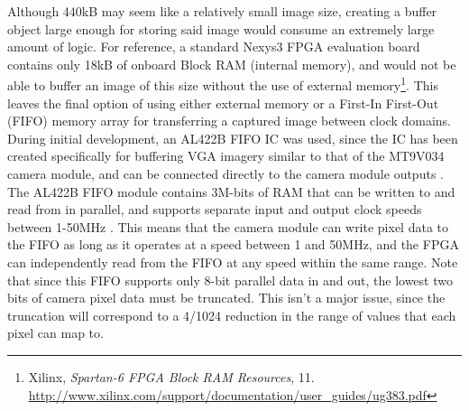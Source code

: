 Although 440kB may seem like a relatively small image size, creating a buffer object large enough for storing said image would consume an extremely large amount of logic. For reference, a standard Nexys3 FPGA evaluation board contains only 18kB of onboard Block RAM (internal memory), and would not be able to buffer an image of this size without the use of external memory\footnote{Xilinx, \textit{Spartan-6 FPGA Block RAM Resources}, 11.\\  \url{http://www.xilinx.com/support/documentation/user_guides/ug383.pdf}}. This leaves the final option of using either external memory or a First-In First-Out (FIFO) memory array for transferring a captured image between clock domains. During initial development, an AL422B FIFO IC was used, since the IC has been created specifically for buffering VGA imagery similar to that of the MT9V034 camera module, and can be connected directly to the camera module outputs \cite{al422b}. The AL422B FIFO module contains 3M-bits of RAM that can be written to and read from in parallel, and supports separate input and output clock speeds between 1-50MHz \cite{al422b}. This means that the camera module can write pixel data to the FIFO as long as it operates at a speed between 1 and 50MHz, and the FPGA can independently read from the FIFO at any speed within the same range. Note that since this FIFO supports only 8-bit parallel data in and out, the lowest two bits of camera pixel data must be truncated. This isn't a major issue, since the truncation will correspond to a 4/1024 reduction in the range of values that each pixel can map to.
\par
